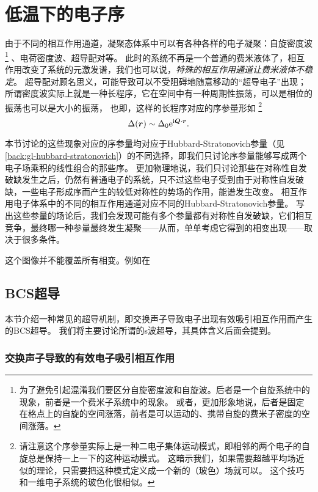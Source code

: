 \chapter{低温下的电子序}\label{chap:low-and-super}

由于不同的相互作用通道，凝聚态体系中可以有各种各样的电子凝聚：自旋密度波%
\footnote{
    为了避免引起混淆我们要区分自旋密度波和自旋波。后者是一个自旋系统中的现象，前者是一个费米子系统中的现象。
    或者，更加形象地说，后者是固定在格点上的自旋的空间涨落，前者是可以运动的、携带自旋的费米子密度的空间涨落。
}%
、电荷密度波、超导配对等。
此时的系统不再是一个普通的费米液体了，相互作用改变了系统的元激发谱，我们也可以说，\emph{特殊的相互作用通道让费米液体不稳定}。
超导配对顾名思义，可能导致可以不受阻碍地随意移动的“超导电子”出现；所谓密度波实际上就是一种长程序，它在空间中有一种周期性振荡，可以是相位的振荡也可以是大小的振荡，
也即，这样的长程序对应的序参量形如%
\footnote{请注意这个序参量实际上是一种二电子集体运动模式，即相邻的两个电子的自旋总是保持一上一下的这种运动模式。
这暗示我们，如果需要超越平均场近似的理论，只需要把这种模式定义成一个新的（玻色）场就可以。
这个技巧和一维电子系统的玻色化很相似。}%
\begin{equation}
    \Delta(\vb*{r}) \sim \Delta_0 \mathrm{e}^{\mathrm{i} \vb*{Q} \cdot \vb*{r}}.
\end{equation}

本节讨论的这些现象对应的序参量均对应于Hubbard-Stratonovich参量（见\autoref{back:gl-hubbard-stratonovich}）的不同选择，即我们只讨论序参量能够写成两个电子场乘积的线性组合的那些序。
更加物理地说，我们只讨论那些在对称性自发破缺发生之后，仍然有普通电子的系统，只不过这些电子受到由于对称性自发破缺，一些电子形成序而产生的较低对称性的势场的作用，能谱发生改变。
相互作用电子体系中的不同的相互作用通道对应不同的Hubbard-Stratonovich参量。
写出这些参量的场论后，我们会发现可能有多个参量都有对称性自发破缺，它们相互竞争，最终哪一种参量最终发生凝聚——从而，单单考虑它得到的相变出现——取决于很多条件。

这个图像并不能覆盖所有相变。例如在

\section{BCS超导}\label{sec:bcs-theory}

本节介绍一种常见的超导机制，即交换声子导致电子出现有效吸引相互作用而产生的BCS超导。
我们将主要讨论所谓的s波超导，其具体含义后面会提到。

\subsection{交换声子导致的有效电子吸引相互作用}\label{sec:phonon-caused-interaction}

